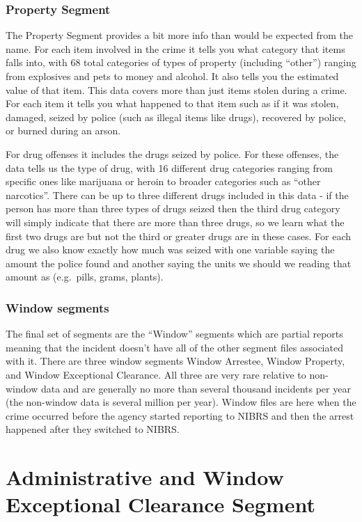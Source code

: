 \documentclass[
]{krantz}
\begin{document}
\subsection{Property Segment}\label{property-segment}

The Property Segment provides a bit more info than would be
expected from the name. For each item involved in the crime
it tells you what category that items falls into, with 68
total categories of types of property (including ``other'')
ranging from explosives and pets to money and alcohol. It
also tells you the estimated value of that item. This data
covers more than just items stolen during a crime. For each
item it tells you what happened to that item such as if it
was stolen, damaged, seized by police (such as illegal items
like drugs), recovered by police, or burned during an arson.

For drug offenses it includes the drugs seized by police.
For these offenses, the data tells us the type of drug, with
16 different drug categories ranging from specific ones like
marijuana or heroin to broader categories such as ``other
narcotics''. There can be up to three different drugs
included in this data - if the person has more than three
types of drugs seized then the third drug category will
simply indicate that there are more than three drugs, so we
learn what the first two drugs are but not the third or
greater drugs are in these cases. For each drug we also know
exactly how much was seized with one variable saying the
amount the police found and another saying the units we
should we reading that amount as (e.g.~pills, grams,
plants).

\subsection{Window segments}\label{window}

The final set of segments are the ``Window'' segments which
are partial reports meaning that the incident doesn't have
all of the other segment files associated with it. There are
three window segments Window Arrestee, Window Property, and
Window Exceptional Clearance. All three are very rare
relative to non-window data and are generally no more than
several thousand incidents per year (the non-window data is
several million per year). Window files are here when the
crime occurred before the agency started reporting to NIBRS
and then the arrest happened after they switched to NIBRS.

\chapter{Administrative and Window Exceptional Clearance
Segment}\label{administrative-and-window-exceptional-clearance-segment}
\end{document}
